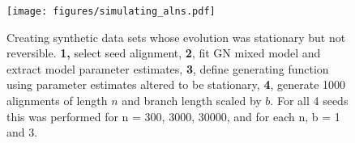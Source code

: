 \begin{figure}[!ht]
\centering
\texttt{[image: figures/simulating\_alns.pdf]}
\caption{Creating synthetic data sets whose evolution was stationary but not reversible. \textbf{1,} select seed alignment, \textbf{2}, fit GN mixed model and extract model parameter estimates, \textbf{3}, define generating function using parameter estimates altered to be stationary, \textbf{4}, generate 1000 alignments of length $n$ and branch length scaled by $b$. For all 4 seeds this was performed for n = 300, 3000, 30000, and for each n, b = 1 and 3.}
\label{fig:simulating_alns}
\end{figure}